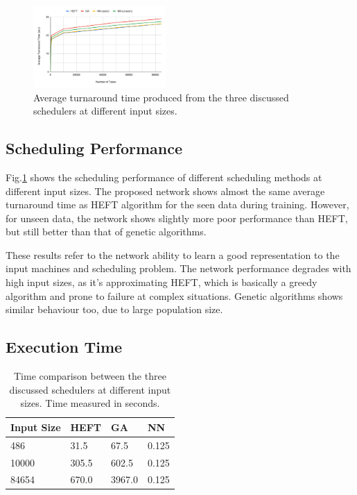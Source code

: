 \begin{figure}[hp]
    \centering
    \includegraphics[width=0.45\textwidth]{diagrams/ta_chart}
    \caption{Average turnaround time produced from the three discussed schedulers at different input sizes.}
    \label{fig:ta_chart}
\end{figure}

\subsection{Scheduling Performance}

Fig.\ref{fig:ta_chart} shows the scheduling performance of different scheduling methods at different input sizes. The proposed network shows almost the same average turnaround time as HEFT algorithm for the seen data during training. However, for unseen data, the network shows slightly more poor performance than HEFT, but still better than that of genetic algorithms. 

These results refer to the network ability to learn a good representation to the input machines and scheduling problem. The network performance degrades with high input sizes, as it's approximating HEFT, which is basically a greedy algorithm and prone to failure at complex situations. Genetic algorithms shows similar behaviour too, due to large population size.

\subsection{Execution Time}
\begin{table}
  \caption{Time comparison between the three discussed schedulers at different input sizes. Time measured in seconds.}
  \label{tab:exec_time}
  \centering
  \begin{tabular}{l l l l}
    \toprule
    Input Size & HEFT & GA & NN \\
    \midrule
    486	& 31.5 & 67.5 & 0.125 \\
    10000 & 305.5 & 602.5 & 0.125 \\
    84654 & 670.0 & 3967.0 & 0.125 \\
    \bottomrule
  \end{tabular}
\end{table}

